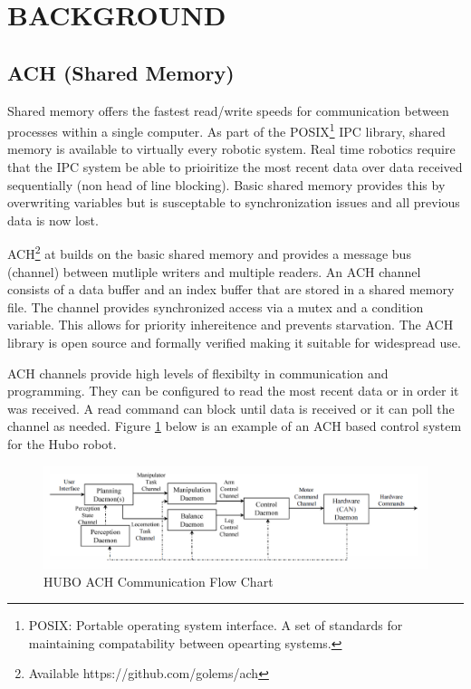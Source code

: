 \section{BACKGROUND}

\subsection{ACH (Shared Memory)}

Shared memory offers the fastest read/write speeds for communication between processes within a single computer. As part of the POSIX\footnote{POSIX: Portable operating system interface. A set of standards for maintaining compatability between opearting systems.} IPC library, shared memory is available to virtually every robotic system. Real time robotics require that the IPC system be able to prioiritize the most recent data over data received sequentially (non head of line blocking). Basic shared memory provides this by overwriting variables but is susceptable to synchronization issues and all previous data is now lost\cite{REALTIMEACH}. 

ACH\footnote{Available https://github.com/golems/ach} at  builds on the basic shared memory and provides a message bus (channel) between mutliple writers and multiple readers. An ACH channel consists of a data buffer and an index buffer that are stored in a shared memory file. The channel provides synchronized access via a mutex and a condition variable. This allows for priority inhereitence and prevents starvation\cite{REALTIMEACH}. The ACH library is open source and formally verified\cite{REALTIMEACH} making it suitable for widespread use.

ACH channels provide high levels of flexibilty in communication and programming. They can be configured to read the most recent data or in order it was received. A read command can block until data is received or it can poll the channel as needed. Figure \ref{fig:ach diagram} below is an example of an ACH based control system for the Hubo robot. 

\begin{figure}[thpb]
 \centering
 \includegraphics[width=1.0\columnwidth]{./images/achflow.png}
  \caption{HUBO ACH Communication Flow Chart}
  \label{fig:ach diagram}
\end{figure} 

